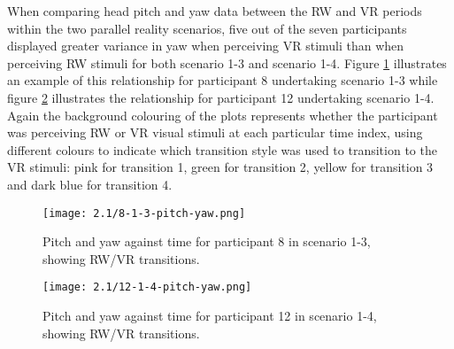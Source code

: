When comparing head pitch and yaw data between the RW and VR periods within the two parallel reality scenarios, five out of the seven participants displayed greater variance in yaw when perceiving VR stimuli than when perceiving RW stimuli for both scenario 1-3 and scenario 1-4. Figure \ref{8-1-3-pitch-yaw.png} illustrates an example of this relationship for participant 8 undertaking scenario 1-3 while figure \ref{12-1-4-pitch-yaw.png} illustrates the relationship for participant 12 undertaking scenario 1-4. Again the background colouring of the plots represents whether the participant was perceiving RW or VR visual stimuli at each particular time index, using different colours to indicate which transition style was used to transition to the VR stimuli: pink for transition 1, green for transition 2, yellow for transition 3 and dark blue for transition 4.

\begin{figure}
	\begin{center}
	\texttt{[image: 2.1/8-1-3-pitch-yaw.png]}
	\caption{Pitch and yaw against time for participant 8 in scenario 1-3, showing RW/VR transitions.}
	\label{8-1-3-pitch-yaw.png}
	\end{center}
\end{figure}


\begin{figure}
	\begin{center}
	\texttt{[image: 2.1/12-1-4-pitch-yaw.png]}
	\caption{Pitch and yaw against time for participant 12 in scenario 1-4, showing RW/VR transitions.}
	\label{12-1-4-pitch-yaw.png}
	\end{center}
\end{figure}

\newpage


